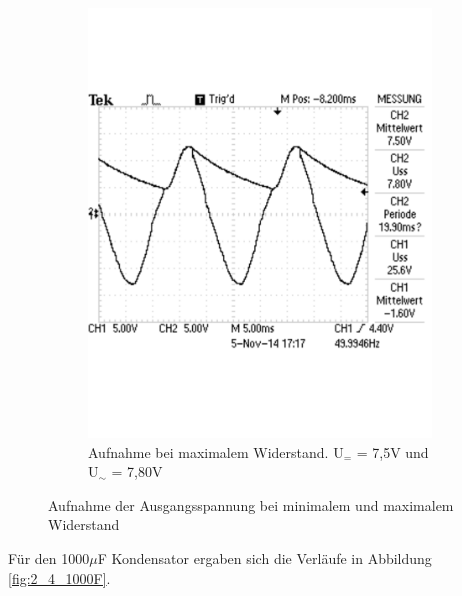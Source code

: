 \documentclass[12pt,a4paper]{article}
\begin{document}
\begin{figure}[H]
\begin{subfigure}[b]{0.48\textwidth}
                \includegraphics[width=\textwidth , scale = 0.4]{2_4_100F_2.pdf}
                \caption[Aufnahme bei maximalem Widerstand. U$_{=}$ = 7,5V und U$_\sim$ = 7,80V]{Aufnahme bei maximalem Widerstand. U$_{=}$ = 7,5V und U$_\sim$ = 7,80V}
  				\label{fig:2_4_100F_2}
        \end{subfigure}
        \caption{Aufnahme der Ausgangsspannung bei minimalem und maximalem Widerstand}
        \label{fig:2_4_100F}
\end{figure}

Für den 1000$\mu$F Kondensator ergaben sich die Verläufe in Abbildung \ref{fig:2_4_1000F}.
\end{document}
